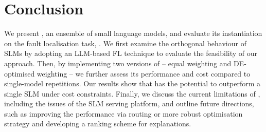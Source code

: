 
\section{Conclusion}
\label{sec:conclusion}

We present \name, an ensemble of small language models, and evaluate its instantiation on the fault localisation task, \cosmosfl. We first examine the orthogonal behaviour of SLMs by adopting an LLM-based FL technique to evaluate the feasibility of our approach. Then, by implementing two versions of \cosmosfl -- equal weighting and DE-optimised weighting -- we further assess its performance and cost compared to single-model repetitions. Our results show that \cosmosfl has the potential to outperform a single SLM under cost constraints. Finally, we discuss the current limitations of \cosmosfl, including the issues of the SLM serving platform, and outline future directions, such as improving the performance via routing or more robust optimisation strategy and developing a ranking scheme for explanations.
